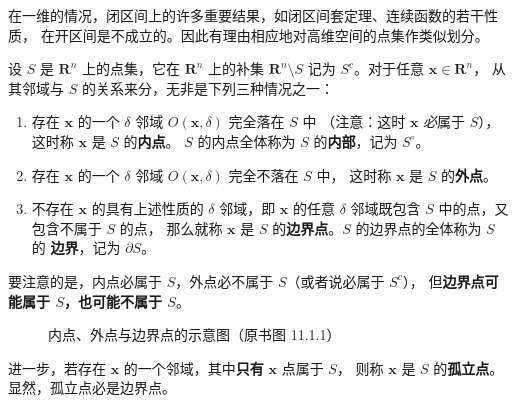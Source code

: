 \documentclass[11pt]{ctexart}
\theoremstyle{plain}
\theoremstyle{definition}
\theoremstyle{remark}
\begin{document}
在一维的情况，闭区间上的许多重要结果，如闭区间套定理、连续函数的若干性质，
在开区间是不成立的。因此有理由相应地对高维空间的点集作类似划分。

设 \(S\) 是 \(\mathbf{R}^n\) 上的点集，它在 \(\mathbf{R}^n\) 上的补集
\(\mathbf{R}^n\setminus S\) 记为 \(S^c\)。对于任意 \(\boldsymbol{x}\in\mathbf{R}^n\)，
从其邻域与 \(S\) 的关系来分，无非是下列三种情况之一：

\begin{enumerate}
  \item 存在 \(\boldsymbol{x}\) 的一个 \(\delta\) 邻域 \(O(\boldsymbol{x},\delta)\) 完全落在 \(S\) 中
        （注意：这时 \(\boldsymbol{x}\) \emph{必}属于 \(S\)），这时称 \(\boldsymbol{x}\) 是 \(S\) 的\textbf{内点}。
        \(S\) 的内点全体称为 \(S\) 的\textbf{内部}，记为 \(S^\circ\)。
  \item 存在 \(\boldsymbol{x}\) 的一个 \(\delta\) 邻域 \(O(\boldsymbol{x},\delta)\) 完全不落在 \(S\) 中，
        这时称 \(\boldsymbol{x}\) 是 \(S\) 的\textbf{外点}。
  \item 不存在 \(\boldsymbol{x}\) 的具有上述性质的 \(\delta\) 邻域，即 \(\boldsymbol{x}\) 的任意
        \(\delta\) 邻域既包含 \(S\) 中的点，又包含不属于 \(S\) 的点，
        那么就称 \(\boldsymbol{x}\) 是 \(S\) 的\textbf{边界点}。\(S\) 的边界点的全体称为 \(S\) 的
        \textbf{边界}，记为 \(\partial S\)。
\end{enumerate}

要注意的是，内点必属于 \(S\)，外点必不属于 \(S\)（或者说必属于 \(S^c\)），
但\textbf{边界点可能属于 \(S\)，也可能不属于 \(S\)}。

\begin{figure}[htbp]
  \centering
  \caption{内点、外点与边界点的示意图（原书图 11.1.1）}
\end{figure}

进一步，若存在 \(\boldsymbol{x}\) 的一个邻域，其中\textbf{只有} \(\boldsymbol{x}\) 点属于 \(S\)，
则称 \(\boldsymbol{x}\) 是 \(S\) 的\textbf{孤立点}。显然，孤立点必是边界点。
\end{document}
